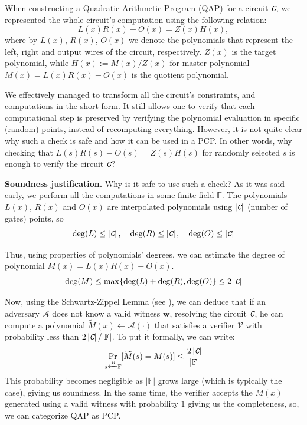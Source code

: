 \documentclass[../lecture-notes.tex]{subfiles}
\begin{document}
When constructing a Quadratic Arithmetic Program (QAP) for a circuit $\textit{\texttt{C}}$, we represented the whole circuit's 
computation using the following relation:
\begin{equation*}
    L(x)R(x) - O(x) = Z(x)H(x),
\end{equation*}
where by $L(x)$, $R(x)$, $O(x)$ we denote the polynomials that represent the left, right and output 
wires of the circuit, respectively. $Z(x)$ is the target polynomial, while
$H(x) := M(x)\big/Z(x)$ for master polynomial $M(x) = L(x)R(x) - O(x)$ is the quotient polynomial.

We effectively managed to transform all the circuit's constraints, and computations in the short form.
It still allows one to verify that each computational step is preserved by verifying the 
polynomial evaluation in specific (random) points, instead of recomputing everything. However, it is 
not quite clear why such a check is safe and how it can be used in a PCP. In other words, why checking that $L(s)R(s)-O(s)=Z(s)H(s)$ for randomly selected $s$ is enough to verify the circuit $\textit{\texttt{C}}$?

\textbf{Soundness justification.} Why is it safe to use such a check? As it was said early, 
we perform all the computations in some finite field $\mathbb{F}$. The 
polynomials $L(x)$, $R(x)$ and $O(x)$ are interpolated polynomials using $\left| \textit{\texttt{C}} \right|$ (number of gates) points, so 
\begin{equation*}
    \deg(L) \le \left| \textit{\texttt{C}} \right|, \quad 
    \deg(R) \le \left| \textit{\texttt{C}} \right|, \quad 
    \deg(O) \le \left| \textit{\texttt{C}} \right|
\end{equation*}

Thus, using properties of polynomials' degrees, we can estimate the degree of polynomial $M(x) = L(x)R(x) - O(x)$.
\begin{equation*}
    \deg(M) \leq \max\{\deg(L) + \deg(R), \deg(O)\} \leq 2 \left| \textit{\texttt{C}} \right|
\end{equation*}

Now, using the Schwartz-Zippel Lemma (see ),
we can deduce that if an adversary $\mathcal{A}$ does not know a valid witness $\mathbf{w}$, 
resolving the circuit $\textit{\texttt{C}}$, he can compute a polynomial $\widetilde{M}(x) \gets \mathcal{A}(\cdot)$ that 
satisfies a verifier $\mathcal{V}$ with probability less than $2 \left| \textit{\texttt{C}} \right|/|\mathbb{F}|$. To put it formally, we can write:
\begin{equation*}
    \mathop{\text{Pr}}_{s \xleftarrow{R} \mathbb{F}}[\widetilde{M}(s) = M(s)] \leq \frac{2 \left| \textit{\texttt{C}} \right|}{|\mathbb{F}|}
\end{equation*}
This probability becomes negligible as $|\mathbb{F}|$ grows large (which is typically the case), giving us soundness. In the same time, the
verifier accepts the $M(x)$ generated using a valid witness with probability $1$ giving us the 
completeness, so, we can categorize QAP as PCP. 
\end{document}
